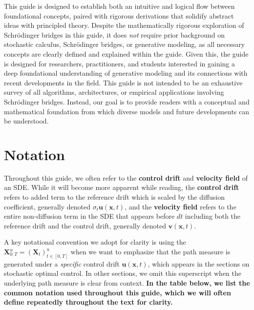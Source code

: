 \documentclass{article}
\begin{document}
This guide is designed to establish both an intuitive and logical flow between foundational concepts, paired with rigorous derivations that solidify abstract ideas with principled theory. Despite the mathematically rigorous exploration of Schrödinger bridges in this guide, it does \textit{not} require prior background on stochastic calculus, Schrödinger bridges, or generative modeling, as all necessary concepts are clearly defined and explained within the guide. Given this, the guide is designed for researchers, practitioners, and students interested in gaining a deep foundational understanding of generative modeling and its connections with recent developments in the field. This guide is not intended to be an exhaustive survey of all algorithms, architectures, or empirical applications involving Schrödinger bridges. Instead, our goal is to provide readers with a conceptual and mathematical foundation from which diverse models and future developments can be understood.

\newpage
\section*{Notation}
Throughout this guide, we often refer to the \textbf{control drift} and \textbf{velocity field} of an SDE. While it will become more apparent while reading, the \textbf{control drift} refers to added term to the reference drift which is scaled by the diffusion coefficient, generally denoted $\sigma_t\boldsymbol{u}(\boldsymbol{x},t)$, and the \textbf{velocity field} refers to the entire non-diffusion term in the SDE that appears before $dt$ including both the reference drift and the control drift, generally denoted $\boldsymbol{v}(\boldsymbol{x},t)$. 

A key notational convention we adopt for clarity is using the $\boldsymbol{X}^u_{0:T}=(\boldsymbol{X}_t)_{t\in [0,T]}^u$ when we want to emphasize that the path measure is generated under a \textit{specific} control drift $\boldsymbol{u}(\boldsymbol{x},t)$, which appears in the sections on stochastic optimal control. In other sections, we omit this superscript when the underlying path measure is clear from context. \textbf{In the table below, we list the common notation used throughout this guide, which we will often define repeatedly throughout the text for clarity.} 
\end{document}
